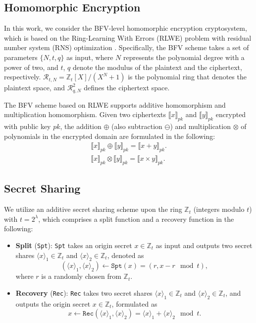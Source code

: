 \documentclass[conference]{IEEEtran}
\newcommand{\Spt}{\texttt{Spt}}
\newcommand{\Rec}{\texttt{Rec}}
\begin{document}
\subsection{Homomorphic Encryption}\label{HE}
In this work, we consider the BFV-level homomorphic encryption cryptosystem, which is based on the Ring-Learning With Errors (RLWE) problem with residual number system (RNS) optimization \cite{bajard2016full}. Specifically, the BFV scheme takes a set of parameters $\{N, t, q\}$ as input, where $N$ represents the polynomial degree with a power of two, and $t$, $q$ denote the modulus of the plaintext and the ciphertext, respectively. $\mathcal{R}_{t,N} = \mathbb{Z}_t [X]/(X^N + 1)$ is the polynomial ring that denotes the plaintext space, and $\mathcal{R}_{q, N}^2$ defines the ciphertext space.

The BFV scheme based on RLWE supports additive homomorphism and multiplication homomorphism. Given two ciphertexts $\llbracket x \rrbracket_{pk}$ and $\llbracket y \rrbracket_{pk}$ encrypted with public key $pk$, the addition $\oplus$ (also subtraction $\ominus$) and multiplication $\otimes$ of polynomials in the encrypted domain are formulated in the following:
\begin{equation*}
\begin{array}{c}
    \llbracket x \rrbracket_{pk} \oplus \llbracket y \rrbracket_{pk} = \llbracket x + y \rrbracket_{pk}. \\
    \llbracket x \rrbracket_{pk} \otimes \llbracket y \rrbracket_{pk} = \llbracket x \times y \rrbracket_{pk}.    
\end{array}
\end{equation*}

\subsection{Secret Sharing}\label{SS}
We utilize an additive secret sharing scheme upon the ring $\mathbb{Z}_t$ (integers modulo $t$) with $t = 2^\lambda$, which comprises a split function and a recovery function in the following:
\begin{itemize}
\item \textbf{Split} (\Spt): \texttt{Spt} takes an origin secret $x \in \mathbb{Z}_t$ as input and outputs two secret shares $\langle x \rangle_1 \in \mathbb{Z}_t$ and $\langle x \rangle_2 \in \mathbb{Z}_t$, denoted as
\begin{equation}
    (\langle x \rangle_1, \langle x \rangle_2) \gets \Spt(x) = (r, x - r\!\!\!\mod t),
\end{equation}
where $r$ is a randomly chosen from $\mathbb{Z}_t$.

\item \textbf{Recovery} (\Rec): \texttt{Rec} takes two secret shares $\langle x \rangle_1 \in \mathbb{Z}_t$ and $\langle x \rangle_2 \in \mathbb{Z}_t$, and outputs the origin secret $x \in \mathbb{Z}_t$, formulated as
\begin{equation}
     x \gets \Rec(\langle x \rangle_1, \langle x \rangle_2) = \langle x \rangle_1 + \langle x \rangle_2\!\!\!\mod t.
\end{equation}
\end{itemize}
\end{document}
